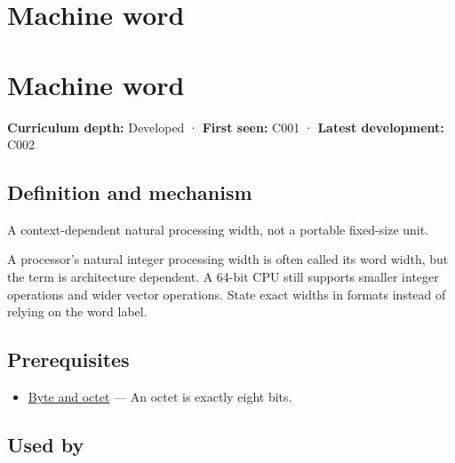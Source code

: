 \hypertarget{appendix-d67a19507dc5}{}
\section*{Machine word}
\section{Machine word}\label{machine-word}

\textbf{Curriculum depth:} Developed · \textbf{First seen:} C001 · \textbf{Latest development:} C002

\subsection{Definition and mechanism}\label{definition-and-mechanism}

A context-dependent natural processing width, not a portable fixed-size unit.

A processor's natural integer processing width is often called its word width, but the term is architecture dependent. A 64-bit CPU still supports smaller integer operations and wider vector operations. State exact widths in formats instead of relying on the word label.

\subsection{Prerequisites}\label{prerequisites}

\begin{itemize}
\tightlist
\item
  \hyperref[appendix-5bee2df85484]{Byte and octet} --- An octet is exactly eight bits.
\end{itemize}

\subsection{Used by}\label{used-by}

